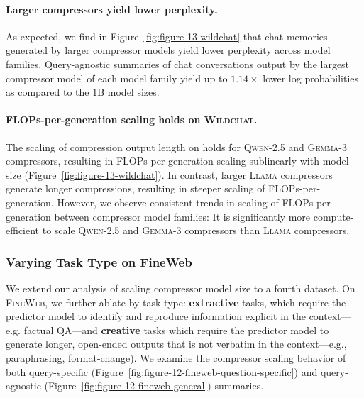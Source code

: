 \documentclass{article} %
\begin{document}
\paragraph*{Larger compressors yield lower perplexity.} As expected, we find in Figure~\ref{fig:figure-13-wildchat} that chat memories generated by larger compressor models yield lower perplexity across model families. Query-agnostic summaries of chat conversations output by the largest compressor model of each model family yield up to \(1.14\times\) lower log probabilities as compared to the \(1\)B model sizes. 

\paragraph*{FLOPs-per-generation scaling holds on \textsc{Wildchat}.} 
The scaling of compression output length on holds for \textsc{Qwen-2.5} and \textsc{Gemma-3} compressors, resulting in FLOPs-per-generation scaling sublinearly with model size (Figure~\ref{fig:figure-13-wildchat}). In contrast, larger \textsc{Llama} compressors generate longer compressions, resulting in steeper scaling of FLOPs-per-generation.  
However, we observe consistent trends in scaling of FLOPs-per-generation between compressor model families: It is significantly more compute-efficient to scale \textsc{Qwen-2.5} and \textsc{Gemma-3} compressors than \textsc{Llama} compressors.

\subsubsection{Varying Task Type on FineWeb}
\label{sec:fineweb-results-appendix}

We extend our analysis of scaling compressor model size to a fourth dataset. On \textsc{FineWeb}, we further ablate by task type: \textbf{extractive} tasks, which require the predictor model to identify and reproduce information explicit in the context---e.g. factual QA---and \textbf{creative} tasks which require the predictor model to generate longer, open-ended outputs that is not verbatim in the context---e.g., paraphrasing, format-change).
We examine the compressor scaling behavior of both query-specific (Figure~\ref{fig:figure-12-fineweb-question-specific}) and query-agnostic (Figure~\ref{fig:figure-12-fineweb-general}) summaries. 
\end{document}
